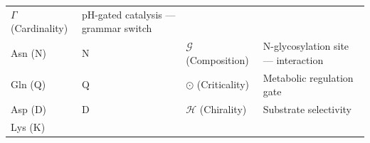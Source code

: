 \begin{longtable}[]{@{}llll@{}}
\begin{minipage}[t]{0.36\columnwidth}
\(\Gamma\) (Cardinality)\strut
\end{minipage} & \begin{minipage}[t]{0.15\columnwidth}\raggedright
pH-gated catalysis --- grammar switch\strut
\end{minipage}\tabularnewline
\begin{minipage}[t]{0.20\columnwidth}\raggedright
Asn (N)\strut
\end{minipage} & \begin{minipage}[t]{0.17\columnwidth}\raggedright
N\strut
\end{minipage} & \begin{minipage}[t]{0.36\columnwidth}\raggedright
\(\mathcal{G}\) (Composition)\strut
\end{minipage} & \begin{minipage}[t]{0.15\columnwidth}\raggedright
N-glycosylation site --- interaction\strut
\end{minipage}\tabularnewline
\begin{minipage}[t]{0.20\columnwidth}\raggedright
Gln (Q)\strut
\end{minipage} & \begin{minipage}[t]{0.17\columnwidth}\raggedright
Q\strut
\end{minipage} & \begin{minipage}[t]{0.36\columnwidth}\raggedright
\(\odot\) (Criticality)\strut
\end{minipage} & \begin{minipage}[t]{0.15\columnwidth}\raggedright
Metabolic regulation gate\strut
\end{minipage}\tabularnewline
\begin{minipage}[t]{0.20\columnwidth}\raggedright
Asp (D)\strut
\end{minipage} & \begin{minipage}[t]{0.17\columnwidth}\raggedright
D\strut
\end{minipage} & \begin{minipage}[t]{0.36\columnwidth}\raggedright
\(\mathcal{H}\) (Chirality)\strut
\end{minipage} & \begin{minipage}[t]{0.15\columnwidth}\raggedright
Substrate selectivity\strut
\end{minipage}\tabularnewline
\begin{minipage}[t]{0.20\columnwidth}\raggedright
Lys (K)\strut
\end{minipage} & \begin{minipage}[t]{0.17\columnwidth}\raggedright

\end{minipage}
\end{longtable}
